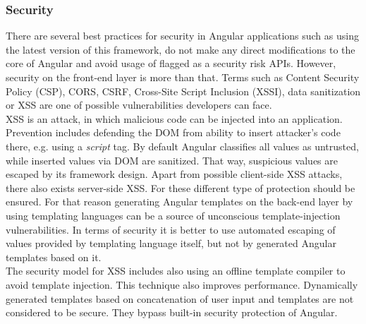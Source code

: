 \documentclass{article} %
\begin{document}
\subsubsection{Security}
There are several best practices for security in Angular applications such as using the latest version of this framework, do not make any direct modifications to the core of Angular and avoid usage of flagged as a security risk APIs. However, security on the front-end layer is more than that. Terms such as Content Security Policy (CSP), CORS, CSRF, Cross-Site Script Inclusion (XSSI), data sanitization or XSS are one of possible vulnerabilities developers can face.\\
\newline
XSS is an attack, in which malicious code can be injected into an application. Prevention includes defending the DOM from ability to insert attacker's code there, e.g. using a \textit{script} tag. By default Angular classifies all values as untrusted, while inserted values via DOM are sanitized. That way, suspicious values are escaped by its framework design. Apart from possible client-side XSS attacks, there also exists server-side XSS. For these different type of protection should be ensured. For that reason generating Angular templates on the back-end layer by using templating languages can be a source of unconscious template-injection vulnerabilities. In terms of security it is better to use automated escaping of values provided by templating language itself, but not by generated Angular templates based on it.\\
\newline
The security model for XSS includes also using an offline template compiler to avoid template injection. This technique also improves performance. Dynamically generated templates based on concatenation of user input and templates are not considered to be secure. They bypass built-in security protection of Angular.\\
\end{document}
